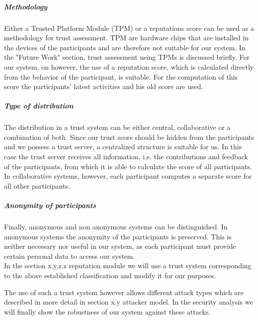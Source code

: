 \documentclass[
a4paper,     %
titlepage,   %
14pt         %
]{scrartcl}  %
\theoremstyle{mystyle}
\begin{document}
\subparagraph{Methodology} Either a Trusted Platform Module (TPM) or a reputations score can be used as a methodology for trust assessment. TPM are hardware chips that are installed in the devices of the participants and are therefore not suitable for our system. In the "Future Work" section, trust assessment using TPMs is discussed briefly. For our system, on however, the use of a reputation score, which is calculated directly from the behavior of the participant, is suitable. For the computation of this score the participants' latest activities and his old score are used.

\subparagraph{Type of distribution} The distribution in a trust system can be either central, collaborative or a combination of both. Since our trust score should be hidden from the participants and we possess a trust server, a centralized structure is suitable for us. In this case the trust server receives all information, i.e. the contributions and feedback of the participants, from which it is able to calculate the score of all participants. In collaborative systems, however, each participant computes a separate score for all other participants.

\subparagraph{Anonymity of participants} Finally, anonymous and non anonymous systems can be distinguished. In anonymous systems the anonymity of the participants is preserved. This is neither necessary nor useful in our system, as each participant must provide certain personal data to access our system. \\

In the section x.y.z.z reputation module we will use a trust system corresponding to the above established classification and modify it for our purposes.

The use of such a trust system however allows different attack types which are described in more detail in section x.y attacker model. In the security analysis we will finally show the robustness of our system against these attacks.
\end{document}
